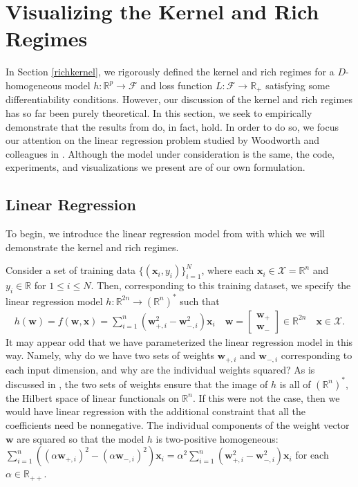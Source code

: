 \documentclass{article}
\begin{document}
\section{Visualizing the Kernel and Rich Regimes}\label{summarizekernel}

In Section \ref{richkernel}, we rigorously defined the kernel and rich regimes for a $D$-homogeneous model $h: \mathbb{R}^p \rightarrow \mathcal{F}$ and loss function $L: \mathcal{F} \rightarrow \mathbb{R}_+$ satisfying some differentiability conditions. However, our discussion of the kernel and rich regimes has so far been purely theoretical. In this section, we seek to empirically demonstrate that the results from \cite{chizat2018lazy} do, in fact, hold. In order to do so, we focus our attention on the linear regression problem studied by Woodworth and colleagues in \cite{woodworth2020kernel}. Although the model under consideration is the same, the code, experiments, and visualizations we present are of our own formulation.

\subsection{Linear Regression}\label{linregmodel}

To begin, we introduce the linear regression model from \cite{woodworth2020kernel} with which we will demonstrate the kernel and rich regimes.

Consider a set of training data $\{ (\boldsymbol{x}_i, y_i)\}_{i=1}^N$, where each $\boldsymbol{x}_i \in \mathcal{X} = \mathbb{R}^n$ and $y_i \in \mathbb{R}$ for $1 \leq i \leq N$. Then, corresponding to this training dataset, we specify the linear regression model $h: \mathbb{R}^{2n} \rightarrow (\mathbb{R}^n)^*$ such that
\begin{align}\label{linreg}
    h(\boldsymbol{w}) = f(\boldsymbol{w}, \boldsymbol{x}) = \sum_{i=1}^n(\boldsymbol{w}_{+, i}^2 - \boldsymbol{w}_{-, i}^2)\boldsymbol{x}_i \quad 
    \boldsymbol{w} = 
    \begin{bmatrix}
        \boldsymbol{w}_+ \\
        \boldsymbol{w}_-
    \end{bmatrix} 
    \in \mathbb{R}^{2n} \quad \boldsymbol{x} \in \mathcal{X}.
\end{align}
It may appear odd that we have parameterized the linear regression model in this way. Namely, why do we have two sets of weights $\boldsymbol{w}_{+, i}$ and $\boldsymbol{w}_{-, i}$ corresponding to each input dimension, and why are the individual weights squared? As is discussed in \cite{woodworth2020kernel}, the two sets of weights ensure that the image of $h$ is all of $(\mathbb{R}^n)^*$, the Hilbert space of linear functionals on $\mathbb{R}^n$. If this were not the case, then we would have linear regression with the additional constraint that all the coefficients need be nonnegative. The individual components of the weight vector $\boldsymbol{w}$ are squared so that the model $h$ is two-positive homogeneous: $\sum_{i=1}^n((\alpha \boldsymbol{w}_{+, i})^2 - (\alpha \boldsymbol{w}_{-, i})^2)\boldsymbol{x}_i = \alpha^2\sum_{i=1}^n(\boldsymbol{w}_{+, i}^2 - \boldsymbol{w}_{-, i}^2)\boldsymbol{x}_i$ for each $\alpha \in \mathbb{R}_{++}$.
\end{document}
